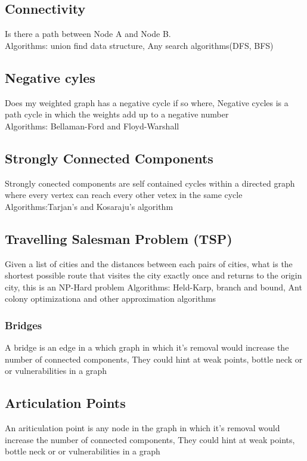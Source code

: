 \documentclass[12pt]{extarticle}
\begin{document}
\subsection{Connectivity}
Is there a path between Node A and Node B. \\
Algorithms: union find data structure, Any search algorithms(DFS, BFS)

\subsection{Negative cyles}
Does my weighted graph has a negative cycle if so where, Negative cycles is a path
cycle in which the weights add up to a negative number \\
Algorithms: Bellaman-Ford and Floyd-Warshall

\subsection{Strongly Connected Components}
Strongly conected components are self contained cycles within a directed graph 
where every vertex can reach every other vetex in the same cycle \\
Algorithms:Tarjan's and Kosaraju's algorithm

\subsection{Travelling Salesman Problem (TSP)}
Given a list of cities and the distances between each pairs of cities, what is 
the shortest possible route that visites the city exactly once and returns to 
the origin city, this is an NP-Hard problem
Algorithms: Held-Karp, branch and bound, Ant colony optimizationa and other 
approximation algorithms

\subsubsection{Bridges}
A bridge is an edge in a which graph in which it's removal would increase the 
number of connected components, They could hint at weak points, bottle neck or
or vulnerabilities in a graph 

\subsection{Articulation Points}
An ariticulation point is any node in the graph in which it's removal would increase
the number of connected components, They could hint at weak points, bottle neck or
or vulnerabilities in a graph 
\end{document}
